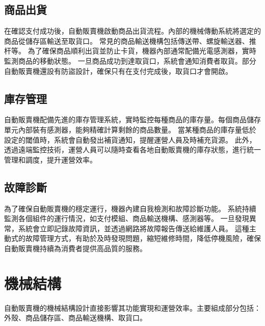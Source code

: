 \documentclass[12pt]{article}       %
\begin{document}
\subsection{商品出貨} 
\hspace{2em}
在確認支付成功後，自動販賣機啟動商品出貨流程。內部的機械傳動系統將選定的商品從儲存區輸送至取貨口。
常見的商品輸送機構包括傳送帶、螺旋輸送器、推杆等。
為了確保商品順利出貨並防止卡貨，機器內部通常配備光電感測器，實時監測商品的移動狀態。
一旦商品成功到達取貨口，系統會通知消費者取貨。部分自動販賣機還設有防盜設計，確保只有在支付完成後，取貨口才會開啟。

\subsection{庫存管理} 
\hspace{2em}
自動販賣機配備先進的庫存管理系統，實時監控每種商品的庫存量。每個商品儲存單元內部裝有感測器，能夠精確計算剩餘的商品數量。
當某種商品的庫存量低於設定的閾值時，系統會自動發出補貨通知，提醒運營人員及時補充貨源。
此外，透過遠端監控技術，運營人員可以隨時查看各地自動販賣機的庫存狀態，進行統一管理和調度，提升運營效率。

\subsection{故障診斷} 
\hspace{2em}
為了確保自動販賣機的穩定運行，機器內建自我檢測和故障診斷功能。
系統持續監測各個組件的運行情況，如支付模組、商品輸送機構、感測器等。
一旦發現異常，系統會立即記錄故障資訊，並透過網路將故障報告傳送給維護人員。
這種主動式的故障管理方式，有助於及時發現問題，縮短維修時間，降低停機風險，確保自動販賣機持續為消費者提供高品質的服務。

\section{\centering 機械結構}
\hspace{2em}
自動販賣機的機械結構設計直接影響其功能實現和運營效率。主要組成部分包括：外殼、商品儲存區、商品輸送機構、取貨口。
\end{document}
